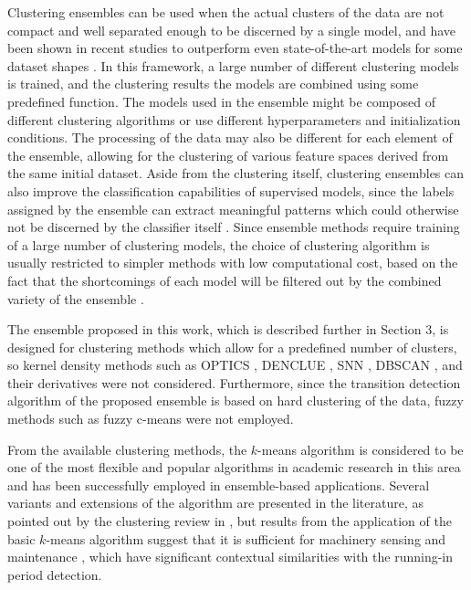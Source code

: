\documentclass[preprint,11pt,number]{elsarticle}
\begin{document}
Clustering ensembles can be used when the actual clusters of the data are not compact and well separated enough to be discerned by a single model, and have been shown in recent studies to outperform even state-of-the-art models for some dataset shapes \cite{Xie2024}. In this framework, a large number of different clustering models is trained, and the clustering results the models are combined using some predefined function. The models used in the ensemble might be composed of different clustering algorithms or use different hyperparameters and initialization conditions. The processing of the data may also be different for each element of the ensemble, allowing for the clustering of various feature spaces derived from the same initial dataset. Aside from the clustering itself, clustering ensembles can also improve the classification capabilities of supervised models, since the labels assigned by the ensemble can extract meaningful patterns which could otherwise not be discerned by the classifier itself \cite{Nanfak2024}. Since ensemble methods require training of a large number of clustering models, the choice of clustering algorithm is usually restricted to simpler methods with low computational cost, based on the fact that the shortcomings of each model will be filtered out by the combined variety of the ensemble \cite{Jain2010, Zhou2012}.

The ensemble proposed in this work, which is described further in Section 3, is designed for clustering methods which allow for a predefined number of clusters, so kernel density methods such as OPTICS \cite{Ankerst1999}, DENCLUE \cite{Hinneburg2007}, SNN \cite{Ertoz2003}, DBSCAN \cite{Ester1996}, and their derivatives \cite{Schubert2017} were not considered. Furthermore, since the transition detection algorithm of the proposed ensemble is based on hard clustering of the data, fuzzy methods such as fuzzy c-means \cite{Bezdek1984} were not employed.

From the available clustering methods, the $k$-means algorithm is considered to be one of the most flexible and popular algorithms in academic research in this area and has been successfully employed in ensemble-based applications\cite{Ahmed2020, Bai2020, Dong2020, Lakshmi2024}. Several variants and extensions of the algorithm are presented in the literature, as pointed out by the clustering review in \cite{Jain2010}, but results from the application of the basic $k$-means algorithm suggest that it is sufficient for machinery sensing and maintenance \cite{Uhlmann2018}, which have significant contextual similarities with the running-in period detection.
\end{document}
